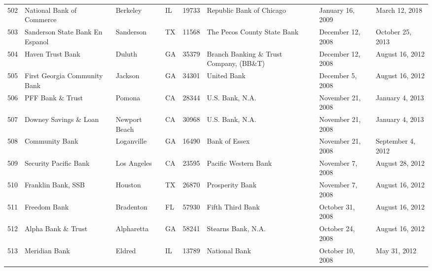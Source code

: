 \begin{tabular}{llllrlll}
502 &                          National Bank of Commerce &            Berkeley &  IL &  19733 &                           Republic Bank of Chicago &    January 16, 2009 &      March 12, 2018 \\
503 &                   Sanderson State Bank  En Espanol &           Sanderson &  TX &  11568 &                        The Pecos County State Bank &   December 12, 2008 &    October 25, 2013 \\
504 &                                   Haven Trust Bank &              Duluth &  GA &  35379 &             Branch Banking \& Trust Company, (BB\&T) &   December 12, 2008 &     August 16, 2012 \\
505 &                       First Georgia Community Bank &             Jackson &  GA &  34301 &                                        United Bank &    December 5, 2008 &     August 16, 2012 \\
506 &                                   PFF Bank \& Trust &              Pomona &  CA &  28344 &                                    U.S. Bank, N.A. &   November 21, 2008 &     January 4, 2013 \\
507 &                              Downey Savings \& Loan &       Newport Beach &  CA &  30968 &                                    U.S. Bank, N.A. &   November 21, 2008 &     January 4, 2013 \\
508 &                                     Community Bank &          Loganville &  GA &  16490 &                                      Bank of Essex &   November 21, 2008 &   September 4, 2012 \\
509 &                              Security Pacific Bank &         Los Angeles &  CA &  23595 &                               Pacific Western Bank &    November 7, 2008 &     August 28, 2012 \\
510 &                                 Franklin Bank, SSB &             Houston &  TX &  26870 &                                    Prosperity Bank &    November 7, 2008 &     August 16, 2012 \\
511 &                                       Freedom Bank &           Bradenton &  FL &  57930 &                                   Fifth Third Bank &    October 31, 2008 &     August 16, 2012 \\
512 &                                 Alpha Bank \& Trust &          Alpharetta &  GA &  58241 &                                 Stearns Bank, N.A. &    October 24, 2008 &     August 16, 2012 \\
513 &                                      Meridian Bank &              Eldred &  IL &  13789 &                                      National Bank &    October 10, 2008 &        May 31, 2012 \\

\end{tabular}
